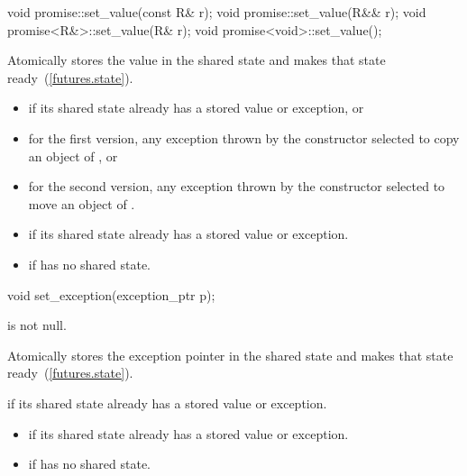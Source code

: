 %
%
\begin{itemdecl}
void promise::set_value(const R& r);
void promise::set_value(R&& r);
void promise<R&>::set_value(R& r);
void promise<void>::set_value();
\end{itemdecl}

\begin{itemdescr}
\pnum
\effects Atomically stores the value  in the shared state and
makes that state ready~(\ref{futures.state}).

\pnum
\throws

\begin{itemize}
\item {} if its shared state
already has a stored value or exception, or
\item for the first version, any exception thrown by the constructor selected to copy an object of , or
\item for the second version, any exception thrown by the constructor selected to move an object of .
\end{itemize}

\pnum
\errors
\begin{itemize}
\item {} if its shared state
already has a stored value or exception.
\item {} if  has no shared state.
\end{itemize}
\end{itemdescr}

%
%
\begin{itemdecl}
void set_exception(exception_ptr p);
\end{itemdecl}

\begin{itemdescr}
\pnum
\requires {} is not null.

\pnum
\effects Atomically stores the exception pointer  in the shared state
and makes that state ready~(\ref{futures.state}).

\pnum
\throws {} if its shared state
already has a stored value or exception.

\pnum
\errors

\begin{itemize}
\item {} if its shared state
already has a stored value or exception.
\item {} if  has no shared state.
\end{itemize}
\end{itemdescr}

